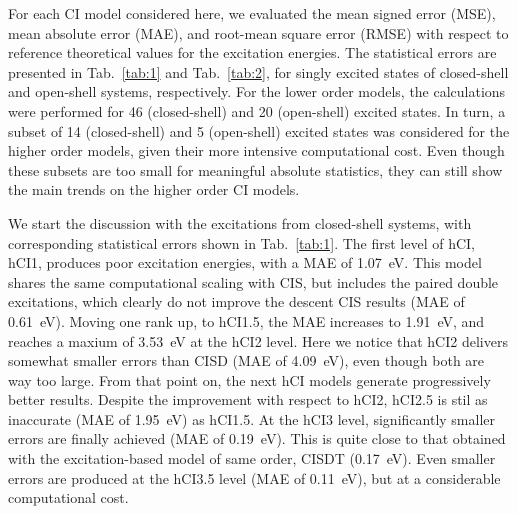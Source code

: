 \documentclass[aip,jcp,reprint,noshowkeys,superscriptaddress]{revtex4-1}
\begin{document}
For each CI model considered here, we evaluated the mean signed error (MSE), mean absolute error (MAE), and root-mean square error (RMSE) 
with respect to reference theoretical values for the excitation energies.
The statistical errors are presented in Tab.~\ref{tab:1} and Tab.~\ref{tab:2},
for singly excited states of closed-shell and open-shell systems, respectively.
For the lower order models, the calculations were performed for 46 (closed-shell) and 20 (open-shell) excited states.
In turn, a subset of 14 (closed-shell) and 5 (open-shell) excited states was considered for the higher order models, given their more intensive computational cost.
Even though these subsets are too small for meaningful absolute statistics, they can still show the main trends on the higher order CI models.


We start the discussion with the excitations from closed-shell systems, with corresponding statistical errors shown in Tab.~\ref{tab:1}.
%
The first level of hCI, hCI1, produces poor excitation energies, with a MAE of \SI{1.07}{\eV}.
This model shares the same computational scaling with CIS, but includes the paired double excitations, 
which clearly do not improve the descent CIS results (MAE of \SI{0.61}{\eV}).
Moving one rank up, to hCI1.5, the MAE increases to \SI{1.91}{\eV}, and reaches a maxium of \SI{3.53}{\eV} at the hCI2 level.
Here we notice that hCI2 delivers somewhat smaller errors than CISD (MAE of \SI{4.09}{\eV}), even though both are way too large.
From that point on, the next hCI models generate progressively better results.
Despite the improvement with respect to hCI2, hCI2.5 is stil as inaccurate (MAE of \SI{1.95}{\eV}) as hCI1.5.
At the hCI3 level, significantly smaller errors are finally achieved (MAE of \SI{0.19}{\eV}).
This is quite close to that obtained with the excitation-based model of same order, CISDT (\SI{0.17}{\eV}).
Even smaller errors are produced at the hCI3.5 level (MAE of \SI{0.11}{\eV}), but at a considerable computational cost.

\end{document}
